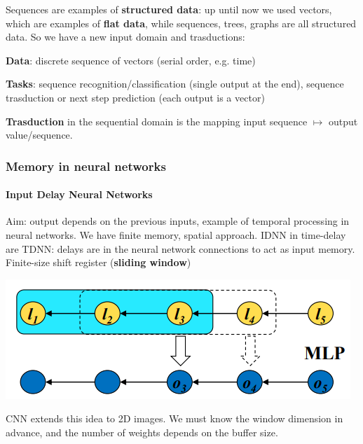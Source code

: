 \documentclass[10pt]{report}
\begin{document}
Sequences are examples of \textbf{structured data}: up until now we used vectors, which are examples of \textbf{flat data}, while sequences, trees, graphs are all structured data. So we have a new input domain and trasductions:
\begin{list}{}{}
	\item \textbf{Data}: discrete sequence of vectors (serial order, e.g. time)
	\item \textbf{Tasks}: sequence recognition/classification (single output at the end), sequence trasduction or next step prediction (each output is a vector)
\end{list}
\textbf{Trasduction} in the sequential domain is the mapping input sequence $\mapsto$ output value/sequence.
\subsubsection{Memory in neural networks}
\paragraph{Input Delay Neural Networks} Aim: output depends on the previous inputs, example of temporal processing in neural networks. We have finite memory, spatial approach. IDNN in time-delay are TDNN: delays are in the neural network connections to act as input memory. Finite-size shift register (\textbf{sliding window})
\begin{center}
	\includegraphics[scale=0.5]{34.png}
\end{center}
CNN extends this idea to 2D images. We must know the window dimension in advance, and the number of weights depends on the buffer size.
\end{document}
